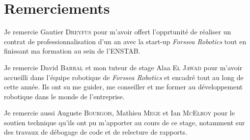 
\section*{Remerciements}

Je remercie Gautier \textsc{Dreyfus} pour m'avoir offert l'opprtunité de réaliser un contrat de professionnalisation d'un an avec la start-up \textit{Forssea Robotics} tout en finissant ma formation au sein de l'\gls{ENSTAB}.

Je remercie David \textsc{Barral} et mon tuteur de stage Alaa \textsc{El Jawad} pour m'avoir accueilli dans l'équipe robotique de \textit{Forssea Robotics} et encadré tout au long de cette année. Ils ont su me guider, me conseiller et me former au développement robotique dans le monde de l'entreprise.

Je remercie aussi Auguste \textsc{Bourgois}, Mathieu \textsc{Mege} et Ian \textsc{McElroy} pour le soutien technique qu'ils ont pu m'apporter au cours de ce stage, notamment sur des travaux de débogage de code et de relecture de rapports.